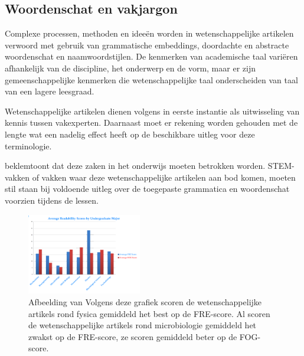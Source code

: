 
\subsection{Woordenschat en vakjargon}

Complexe processen, methoden en ideeën worden in wetenschappelijke artikelen verwoord met gebruik van grammatische embeddings, doordachte en abstracte woordenschat en naamwoordstijlen. De kenmerken van academische taal variëren afhankelijk van de discipline, het onderwerp en de vorm, maar er zijn gemeenschappelijke kenmerken die wetenschappelijke taal onderscheiden van taal van een lagere leesgraad. \autocite{Ennals2010, Snow2010}

Wetenschappelijke artikelen dienen volgens \textcite{PlavenSigray2017} in eerste instantie als uitwisseling van kennis tussen vakexperten. Daarnaast moet er rekening worden gehouden met de lengte wat een nadelig effect heeft op de beschikbare uitleg voor deze terminologie.

\textcite{Snow2010} beklemtoont dat deze zaken in het onderwijs moeten betrokken worden. STEM-vakken of vakken waar deze wetenschappelijke artikelen aan bod komen, moeten stil staan bij voldoende uitleg over de toegepaste grammatica en woordenschat voorzien tijdens de lessen.

\begin{figure}[H]
	\includegraphics[width=5cm]{img/fre-fog-per-sector.png}
	\caption{Afbeelding van \textcite{Murdos2014} Volgens deze grafiek scoren de wetenschappelijke artikels rond fysica gemiddeld het best op de FRE-score. Al scoren de wetenschappelijke artikels rond microbiologie gemiddeld het zwakst op de FRE-score, ze scoren gemiddeld beter op de FOG-score.}
\end{figure}

